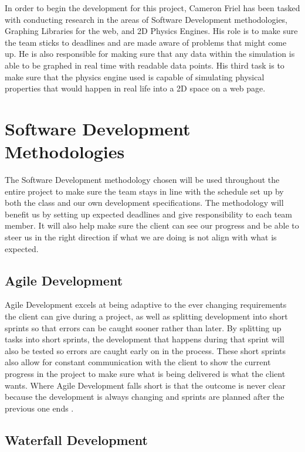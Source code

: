 \documentclass[capstone.tex]{subfiles}
\begin{document}
In order to begin the development for this project, Cameron Friel has been tasked with conducting research in the areas of Software Development methodologies, Graphing Libraries for the web, and 2D Physics Engines. His role is to make sure the team sticks to deadlines and are made aware of problems that might come up. He is also responsible for making sure that any data within the simulation is able to be graphed in real time with readable data points. His third task is to make sure that the physics engine used is capable of simulating physical properties that would happen in real life into a 2D space on a web page.

\section{Software Development Methodologies}

The Software Development methodology chosen will be used throughout the entire project to make sure the team stays in line with the schedule set up by both the class and our own development specifications. The methodology will benefit us by setting up expected deadlines and give responsibility to each team member. It will also help make sure the client can see our progress and be able to steer us in the right direction if what we are doing is not align with what is expected. 

\subsection{Agile Development}

Agile Development excels at being adaptive to the ever changing requirements the client can give during a project, as well as splitting development into short sprints so that errors can be caught sooner rather than later. By splitting up tasks into short sprints, the development that happens during that sprint will also be tested so errors are caught early on in the process. These short sprints also allow for constant communication with the client to show the current progress in the project to make sure what is being delivered is what the client wants. Where Agile Development falls short is that the outcome is never clear because the development is always changing and sprints are planned after the previous one ends \cite{Software_Development}.  

\subsection{Waterfall Development}
\end{document}
